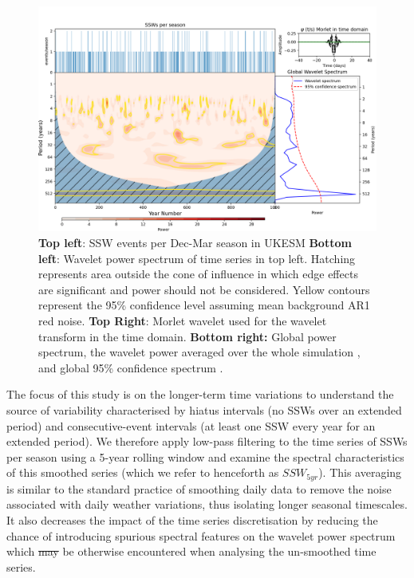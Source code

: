 \documentclass[wcd, manuscript]{copernicus}
\providecommand{\DIFadd}[1]{{\protect\color{blue}\uwave{#1}}} %
\providecommand{\DIFdel}[1]{{\protect\color{red}\sout{#1}}}                      %
\providecommand{\DIFaddbegin}{} %
\providecommand{\DIFaddend}{} %
\providecommand{\DIFdelbegin}{} %
\providecommand{\DIFdelend}{} %
\providecommand{\DIFaddFL}[1]{\DIFadd{#1}} %
\providecommand{\DIFaddbeginFL}{} %
\providecommand{\DIFaddendFL}{} %
\providecommand{\DIFdelbeginFL}{} %
\providecommand{\DIFdelendFL}{} %
\begin{document}
\begin{center}
\begin{figure}[h!]
\noindent\DIFdelbeginFL %
\DIFdelendFL \DIFaddbeginFL \includegraphics[width = 0.8\linewidth]{new_changed_figures/SSW_wavelet_new_levels.png}
\DIFaddendFL \caption{\textbf{Top left}: SSW events per Dec-Mar season in UKESM \textbf{Bottom left}: Wavelet power spectrum of time series in top left. Hatching represents area outside the cone of influence in which edge effects are significant and power should not be considered. Yellow contours represent the 95\% confidence level assuming mean background AR1 red noise. \textbf{Top Right}: Morlet wavelet used for the wavelet transform in the time domain. \textbf{Bottom right:} Global power spectrum, the wavelet power averaged over the whole simulation \DIFaddbeginFL \DIFaddFL{(blue line)}\DIFaddendFL , and global 95\% confidence spectrum \DIFaddbeginFL \DIFaddFL{(red dashed line)}\DIFaddendFL .}
\label{fig3}
\end{figure}
\end{center}


The focus of this study is on the longer-term time variations to understand the source of variability characterised by hiatus intervals (no SSWs over an extended period) and consecutive-event intervals (at least one SSW every year for an extended period). We therefore apply low-pass filtering to the time series of SSWs per season using a 5-year rolling window and examine the spectral characteristics of this smoothed series (which we refer to henceforth as $SSW_{5yr}$). This averaging is similar to the standard practice of smoothing daily data to remove the noise associated with daily weather variations, thus isolating longer seasonal timescales. It also decreases the impact of the time series discretisation by reducing the chance of introducing spurious spectral features on the wavelet power spectrum which \DIFdelbegin \DIFdel{may }\DIFdelend \DIFaddbegin \DIFadd{could }\DIFaddend be otherwise encountered when analysing the un-smoothed time series.  
\end{document}

